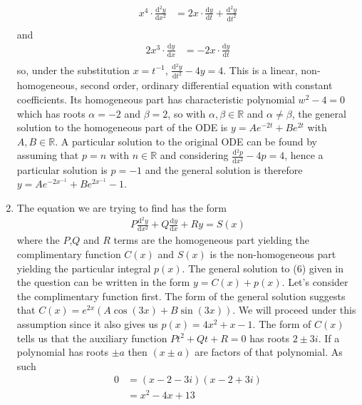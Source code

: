 \documentclass[10pt]{article}
\newcommand*{\dydx}[0]{\frac{\text{d}y}{\text{d}x}}
\newcommand*{\df}[2]{\frac{\text{d}{#1}}{\text{d}{#2}}}%
\begin{document}
\begin{enumerate}
\begin{align*}
                x^4\cdot\df{^2y}{x^2} &= 2x\cdot\df{y}{t} + \df{^2y}{t^2} \\
            \end{align*}
            and
            \begin{align*}
                2x^3\cdot\df{y}{x} &= -2x\cdot\df{y}{t} \\
            \end{align*}
            so, under the substitution $x=t^{-1}$, $\df{^2y}{t^2} - 4y = 4$.
            This is a linear, non-homogeneous, second order, ordinary
            differential equation with constant coefficients. Its homogeneous
            part has characteristic polynomial $w^2 - 4 = 0$ which has roots
            $\alpha = -2$ and $\beta = 2$, so with $\alpha, \beta \in
            \mathbb{R}$ and $\alpha \neq \beta$, the general solution to the
            homogeneous part of the ODE is $y = Ae^{-2t} + Be^{2t}$ with $A, B
            \in \mathbb{R}$. A particular solution to the original ODE  can be
            found by assuming that $p = n$ with $n \in \mathbb{R}$ and
            considering $\df{^2p}{x^2} - 4p = 4$, hence a particular solution
            is $p = -1$ and the general solution is therefore
            $y = Ae^{-2x^{-1}} + Be^{2x^{-1}} - 1$.
        \item The equation we are trying to find has the form 
            \begin{align}
            P\df{^2y}{x^2} + Q\dydx + Ry = S(x)
            \end{align}
            where the $P$,$Q$ and $R$ terms are the
            homogeneous part yielding the complimentary function $C(x)$ and
            $S(x)$ is the non-homogeneous part yielding the particular integral
            $p(x)$. The general solution to (6) given in the question can be
            written in the form $y = C(x) + p(x)$. Let's consider the
            complimentary function first. The form of the general solution
            suggests that $C(x) = e^{2x}(A\cos(3x) + B\sin(3x))$. We will
            proceed under this assumption since it also gives us $p(x) = 4x^2 +
            x - 1$.  The form of $C(x)$ tells us that the auxiliary function
            $Pt^2 + Qt + R = 0$ has roots $2\pm 3i$. If a polynomial has roots
            $\pm a$ then $(x \pm a)$ are factors of that polynomial. As such 
            \begin{align*}
                0 &= (x - 2 - 3i)(x - 2 + 3i) \\
                &= x^2 - 4 x + 13
            \end{align*}

\end{enumerate}
\end{document}

